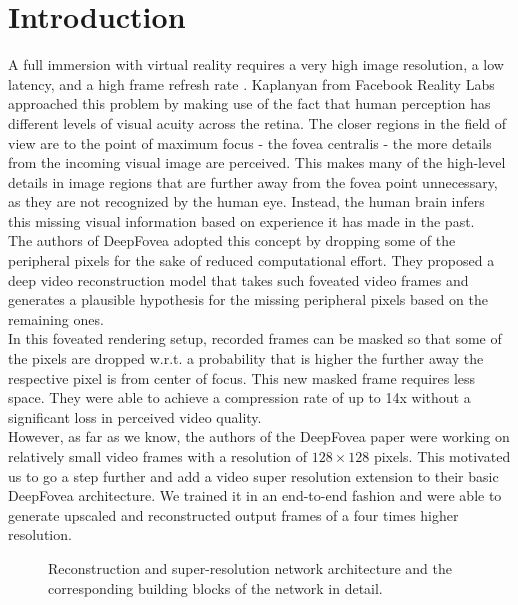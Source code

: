\documentclass[10pt,twocolumn,letterpaper]{article}
\begin{document}
	\section{Introduction} \label{sec:introduction}
	A full immersion with virtual reality requires a very high image resolution, a low latency, and a high frame refresh rate \cite{deepfovea}. Kaplanyan \etal \cite{deepfovea} from Facebook Reality Labs approached this problem by making use of the fact that human perception has different levels of visual acuity across the retina. The closer regions in the field of view are to the point of maximum focus - the fovea centralis - the more details from the incoming visual image are perceived. This makes many of the high-level details in image regions that are further away from the fovea point unnecessary, as they are not recognized by the human eye. Instead, the human brain infers this missing visual information based on experience it has made in the past.\\
	The authors of DeepFovea \cite{deepfovea} adopted this concept by dropping some of the peripheral pixels for the sake of reduced computational effort. They proposed a deep video reconstruction model that takes such foveated video frames and generates a plausible hypothesis for the missing peripheral pixels based on the remaining ones.\\
	In this foveated rendering setup, recorded frames can be masked so that some of the pixels are dropped w.r.t. a probability that is higher the further away the respective pixel is from center of focus. This new masked frame requires less space. They were able to achieve a compression rate of up to 14x without a significant loss in perceived video quality.\\
	However, as far as we know, the authors of the DeepFovea paper were working on relatively small video frames with a resolution of $128\times 128$ pixels. This motivated us to go a step further and add a video super resolution extension to their basic DeepFovea architecture. We trained it in an end-to-end fashion and were able to generate upscaled and reconstructed output frames of a four times higher resolution.\\
	
	\begin{figure}[htbp!]
		\centering
		
		\caption{Reconstruction and super-resolution network architecture and the corresponding building blocks of the network in detail.}
		\label{fig:reconstructionnetwork}
	\end{figure}
	
\end{document}
